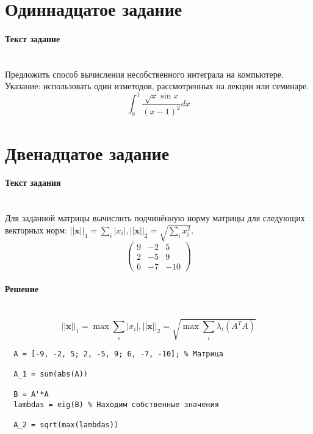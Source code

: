 \section{Одиннадцатое задание}
\paragraph{Текст задание} ~\\
Предложить способ вычисления несобственного интеграла на компьютере. Указание: использовать один изметодов, рассмотренных на лекции или семинаре.
\[
  \int_{0}^{1}\frac{\sqrt{x} \sin x}{(x - 1)^{2}} dx
\]

\section{Двенадцатое задание}
\paragraph{Текст задания} ~\\
Для заданной матрицы вычислить подчинённую норму матрицы для следующих векторных норм: $ ||\textbf{x}||_{1} = \sum_{i}|x_{i}|, ||\textbf{x}||_{2} = \sqrt{\sum_{i} x_{i}^{2}}$.\\
\[
  \begin{pmatrix}
    9 & -2 & 5\\
    2 & -5 & 9\\
    6 & -7 & -10
  \end{pmatrix}
\]

\paragraph{Решение} ~\\
\[
  ||\textbf{x}||_{1} = \max \sum_{i} |x_{i}|, ||\textbf{x}||_{2} = \sqrt{\max \sum_{i} \lambda_{i} (A^{T}A)}
\]
\begin{lstlisting}
  A = [-9, -2, 5; 2, -5, 9; 6, -7, -10]; % Матрица

  A_1 = sum(abs(A))

  B = A'*A
  lambdas = eig(B) % Находим собственные значения

  A_2 = sqrt(max(lambdas))
\end{lstlisting}
